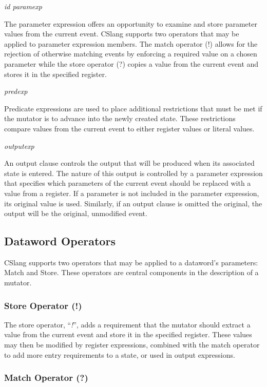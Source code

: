 \textit{id paramexp}

The parameter expression offers an opportunity to examine and store
parameter values from the current event.  CSlang supports two operators
that may be applied to parameter expression members.  The match operator
(!) allows for the rejection of otherwise matching events
by enforcing a required value on a
chosen parameter while the store operator (?) copies a value from the
current event and stores it in the specified register.


\textit{predexp}

Predicate expressions are used to place additional restrictions that must
be met if the mutator is to advance into the newly created state.  These
restrictions compare values from the current event to either register
values or literal values.

\textit{outputexp}

An output clause controls the output that will be produced when its
associated state is entered.  The nature of this output is controlled by a
parameter expression that specifies which parameters of the current event
should be replaced with a value from a register.  If a parameter is not
included in the parameter expression, its original value is used.
Similarly,
if an output clause is omitted the original, the output will be the
original, unmodified event.

\subsection{Dataword Operators}
\label{sub:DatawordOperators}

CSlang supports two operators that may be applied to a dataword's
parameters: Match and Store.  These operators are central components in
the description of a mutator.

\subsubsection{Store Operator (!)}

The store operator, ``\textit{!}'', adds a requirement that the
mutator should extract a value from the current event and store
it in the specified register.  These values may then be modified by
register expressions, combined with the match operator to add more
entry requirements to a state, or used in output expressions.

\subsubsection{Match Operator (?)}

